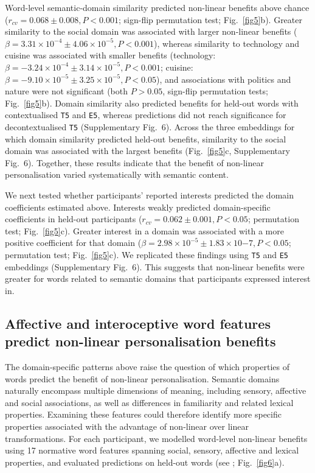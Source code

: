 \documentclass[pdflatex,sn-mathphys]{sn-jnl}
\begin{document}
Word-level semantic-domain similarity predicted non-linear benefits above chance ($r_{cv} = 0.068\pm0.008, P < 0.001$; sign-flip permutation test; Fig.~\ref{fig5}b). Greater similarity to the social domain was associated with larger non-linear benefits ($\beta = 3.31\times10^{-4}\pm4.06\times10^{-5}, P < 0.001$), whereas similarity to technology and cuisine was associated with smaller benefits (technology: $\beta = -3.24\times10^{-4}\pm3.14\times10^{-5}, P < 0.001$; cuisine: $\beta = -9.10\times10^{-5}\pm3.25\times10^{-5}, P < 0.05$), and associations with politics and nature were not significant (both $P > 0.05$, sign-flip permutation tests; Fig.~\ref{fig5}b). Domain similarity also predicted benefits for held-out words with contextualised \texttt{T5} and \texttt{E5}, whereas predictions did not reach significance for decontextualised \texttt{T5} (Supplementary Fig.~6). Across the three embeddings for which domain similarity predicted held-out benefits, similarity to the social domain was associated with the largest benefits (Fig.~\ref{fig5}c, Supplementary Fig.~6). Together, these results indicate that the benefit of non-linear personalisation varied systematically with semantic content.

We next tested whether participants' reported interests predicted the domain coefficients estimated above. Interests weakly predicted domain-specific coefficients in held-out participants ($r_{cv} = 0.062\pm0.001, P < 0.05$; permutation test; Fig.~\ref{fig5}c). Greater interest in a domain was associated with a more positive coefficient for that domain ($\beta = 2.98\times10^{-5}\pm1.83\times10{-7}, P < 0.05$; permutation test; Fig.~\ref{fig5}c). We replicated these findings using \texttt{T5} and \texttt{E5} embeddings (Supplementary Fig.~6). This suggests that non-linear benefits were greater for words related to semantic domains that participants expressed interest in.

\subsection{Affective and interoceptive word features predict non-linear personalisation benefits}
The domain-specific patterns above raise the question of which properties of words predict the benefit of non-linear personalisation. Semantic domains naturally encompass multiple dimensions of meaning, including sensory, affective and social associations, as well as differences in familiarity and related lexical properties. Examining these features could therefore identify more specific properties associated with the advantage of non-linear over linear transformations. For each participant, we modelled word-level non-linear benefits using 17 normative word features spanning social, sensory, affective and lexical properties, and evaluated predictions on held-out words (see ; Fig.~\ref{fig6}a).
\end{document}
